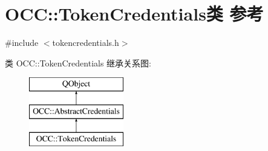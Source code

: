 \hypertarget{class_o_c_c_1_1_token_credentials}{}\section{O\+CC\+:\+:Token\+Credentials类 参考}
\label{class_o_c_c_1_1_token_credentials}


{\ttfamily \#include $<$tokencredentials.\+h$>$}

类 O\+CC\+:\+:Token\+Credentials 继承关系图\+:\begin{figure}[H]
\begin{center}
\leavevmode
\includegraphics[height=3.000000cm]{class_o_c_c_1_1_token_credentials}
\end{center}
\end{figure}

